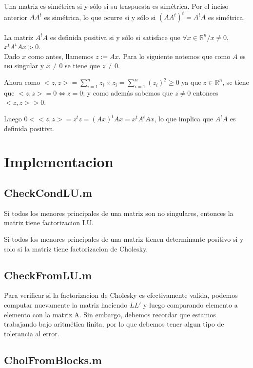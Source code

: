 \documentclass[10pt,a4paper]{article}
\begin{document}
Una matriz es simétrica si y sólo si su traspuesta es simétrica. Por el inciso anterior $AA^t$ es simétrica, lo que ocurre si y sólo si $(AA^t)^t = A^tA$ es simétrica.
\\
\\
La matriz $A^tA$ es definida positiva si y sólo si satisface que $\forall x \in \mathbb{R}^n / x \neq 0,$ $x^tA^tAx > 0$.
\\
Dado $x$ como antes, llamemos $z:=Ax$. Para lo siguiente notemos que como $A$ es \textbf{no} singular y $ x \neq 0$ se tiene que $z \neq 0$.

Ahora como $<z,z> = \sum_{i=1}^{n} z_i \times z_i = \sum_{i=1}^{n} (z_i)^2 \geq 0$ ya que $z \in \mathbb{R}^n$, se tiene que $<z,z> = 0 \Leftrightarrow z = 0$; y como además sabemos que $z \neq 0$ entonces $ <z,z>  > 0$.

Luego $0 < <z,z> = z^tz = (Ax)^tAx = x^tA^tAx$, lo que implica que $A^tA$ es definida positiva.

\pagebreak

\section{Implementacion}

\subsection{CheckCondLU.m}

Si todos los menores principales de una matriz son no singulares, entonces la matriz tiene factorizacion LU.

Si todos los menores principales de una matriz tienen determinante positivo si y solo si la matriz tiene factorizacion de Cholesky.

\subsection{CheckFromLU.m}

Para verificar si la factorizacion de Cholesky es efectivamente valida, podemos computar nuevamente la matriz haciendo $LL'$ y luego comparando elemento a elemento con la matriz A. Sin embargo, debemos recordar que estamos trabajando bajo aritmética finita, por lo que debemos tener algun tipo de tolerancia al error.

\subsection{CholFromBlocks.m}
\end{document}
